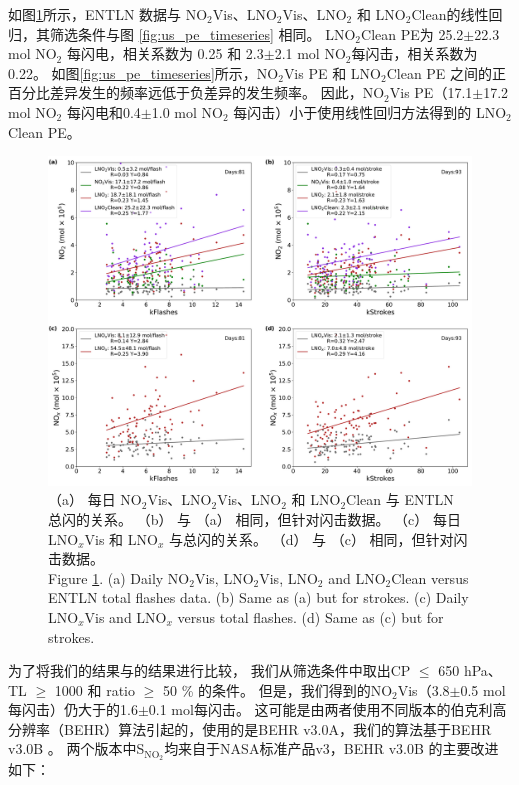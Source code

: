 如图\ref{fig:us_pe_linear}所示，ENTLN 数据与 NO$_2$Vis、LNO$_2$Vis、LNO$_2$ 和 LNO$_2$Clean的线性回归，其筛选条件与图 \ref{fig:us_pe_timeseries} 相同。
LNO$_2$Clean PE为 25.2$\pm$22.3 mol NO$_2$ 每闪电，相关系数为 0.25 和 2.3$\pm$2.1 mol NO$_2$每闪击，相关系数为 0.22。
如图\ref{fig:us_pe_timeseries}所示，NO$_2$Vis PE 和 LNO$_2$Clean PE 之间的正百分比差异发生的频率远低于负差异的发生频率。
因此，NO$_2$Vis PE（17.1$\pm$17.2 mol NO$_2$ 每闪电和0.4$\pm$1.0 mol NO$_2$ 每闪击）小于使用线性回归方法得到的 LNO$_2$Clean PE。

\begin{figure}[!htbp]
    \includegraphics[width=15cm]{./figures/us_pe_linear.pdf}
    \caption{（a） 每日 NO$_2$Vis、LNO$_2$Vis、LNO$_2$ 和 LNO$_2$Clean 与 ENTLN 总闪的关系。
    （b） 与 （a） 相同，但针对闪击数据。
    （c） 每日 LNO$_x$Vis 和 LNO$_x$ 与总闪的关系。
    （d） 与 （c） 相同，但针对闪击数据。\\
    Figure \ref{fig:us_pe_linear}. (a) Daily NO$_2$Vis, LNO$_2$Vis, LNO$_2$ and LNO$_2$Clean versus ENTLN total flashes data.
    (b) Same as (a) but for strokes. (c) Daily LNO$_x$Vis and LNO$_x$ versus total flashes. (d) Same as (c) but for strokes.}
    \label{fig:us_pe_linear}
\end{figure}

为了将我们的结果与\citet{Lapierre.2020}的结果进行比较，
我们从筛选条件中取出CP $\leq$ 650 hPa、TL $\geq$ 1000 和 ratio $\geq$ 50 \% 的条件。
但是，我们得到的NO$_2$Vis（3.8$\pm$0.5 mol每闪击）仍大于\citet{Lapierre.2020}的1.6$\pm$0.1 mol每闪击。
这可能是由两者使用不同版本的伯克利高分辨率（BEHR）算法引起的，\citet{Lapierre.2020}使用的是BEHR v3.0A，我们的算法基于BEHR v3.0B \citep{Laughner.2019a}。
两个版本中S$_{\textrm{NO$_2$}}$均来自于NASA标准产品v3，BEHR v3.0B 的主要改进如下：

